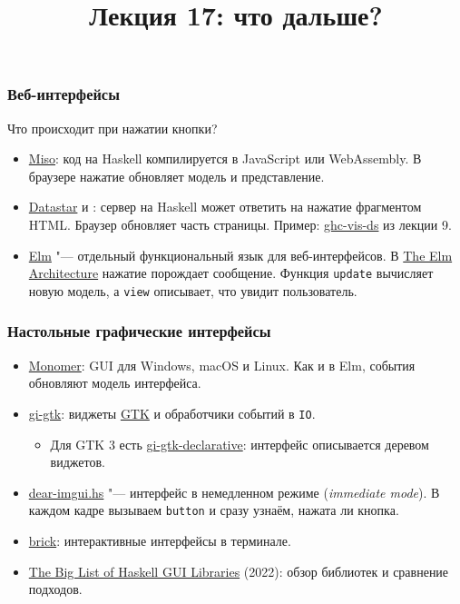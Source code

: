 \documentclass[11pt]{beamer}
\title{Лекция 17: что дальше?}
\begin{document}
\begin{frame}[plain]
  \maketitle
\end{frame}

\begin{frame}[fragile]
  \frametitle{Веб-интерфейсы}
  \small
  Что происходит при нажатии кнопки?
  \begin{itemize}
    \item \href{https://haskell-miso.org/}{Miso}: код на Haskell компилируется в JavaScript или WebAssembly. В браузере нажатие обновляет модель и представление.
    \item \href{https://data-star.dev/}{Datastar} и : сервер на Haskell может ответить на нажатие фрагментом HTML. Браузер обновляет часть страницы. Пример: \href{https://carlo-hamalainen.net/2026/08/06/ghc-vis-ds/}{ghc-vis-ds} из лекции 9.
    \item \href{https://elm-lang.org/}{Elm} "--- отдельный функциональный язык для веб-интерфейсов. В \href{https://guide.elm-lang.org/architecture/}{The Elm Architecture} нажатие порождает сообщение. Функция \texttt{update} вычисляет новую модель, а \texttt{view} описывает, что увидит пользователь.
  \end{itemize}
\end{frame}

\begin{frame}
  \frametitle{Настольные графические интерфейсы}
  \small
  \begin{itemize}
    \item \href{https://github.com/fjvallarino/monomer}{Monomer}: GUI для Windows, macOS и Linux. Как и в Elm, события обновляют модель интерфейса.
    \item \href{https://github.com/haskell-gi/haskell-gi}{gi-gtk}: виджеты \href{https://www.gtk.org/}{GTK} и обработчики событий в \texttt{IO}.
          \begin{itemize}
            \item Для GTK 3 есть \href{https://github.com/owickstrom/gi-gtk-declarative}{gi-gtk-declarative}: интерфейс описывается деревом виджетов.
          \end{itemize}
    \item \href{https://github.com/haskell-game/dear-imgui.hs}{dear-imgui.hs} "--- интерфейс в немедленном режиме (\emph{immediate mode}). В каждом кадре вызываем \texttt{button} и сразу узнаём, нажата ли кнопка.
    \item \href{https://github.com/jtdaugherty/brick}{brick}: интерактивные интерфейсы в терминале.
    \item \href{https://bradrn.com/posts/hs-gui-libs.html}{The Big List of Haskell GUI Libraries} (2022): обзор библиотек и сравнение подходов.
  \end{itemize}
\end{frame}
\end{document}
